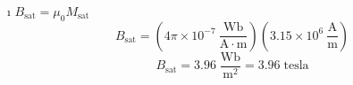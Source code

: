 \begin {corrige}[\thechapter ]{\i}
 $B_{\mathrm{sat}}=\mu_0 M_{\mathrm{sat}}$
$$B_{\mathrm{sat}}=\left(   4\pi\times10^{-7}\:\mathrm{\frac{Wb}{A\cdot m}}\right) \left( 3.15\times 10^6 \:\mathrm{\frac{A}{m}}  \right)  $$
$$B_{\mathrm{sat}}=3.96\;\mathrm{\frac{Wb}{m^2}}=3.96\;\mathrm{tesla}$$
\end {corrige}\par \vspace *{\spacebeforeexo }
